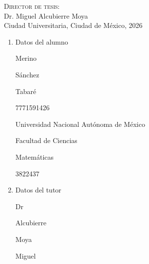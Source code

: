 \begin{titlepage}
\begin{minipage}[c][0.81\textheight][t]{0.65\textwidth}
\begin{center}
            \textsc{\large Director de tesis:}\\[0.7cm] 
            \large Dr. Miguel Alcubierre Moya\\[1.3cm]


            {Ciudad Universitaria, Ciudad de México, 2026}
        \end{center}
        
    \end{minipage}
    \afterpage{\null\newpage}
\end{titlepage}
\renewcommand{\tablename}{Tabla}

\begin{enumerate}
    \item Datos del alumno
    
	Merino 
	\vspace{-2mm}
	
	Sánchez 
	\vspace{-2mm}
	
	Tabaré
	\vspace{-2mm}
	
	7771591426
	\vspace{-2mm}
	
	Universidad Nacional Autónoma de México
	\vspace{-2mm}
	
	Facultad de Ciencias
	\vspace{-2mm}
	
	Matemáticas
	\vspace{-2mm}
	
	3822437
	
	\item Datos del tutor
	
	Dr
	\vspace{-2mm}
	
	Alcubierre
	\vspace{-2mm}
	
	Moya
	\vspace{-2mm}
	
	Miguel
	
\end{enumerate}
